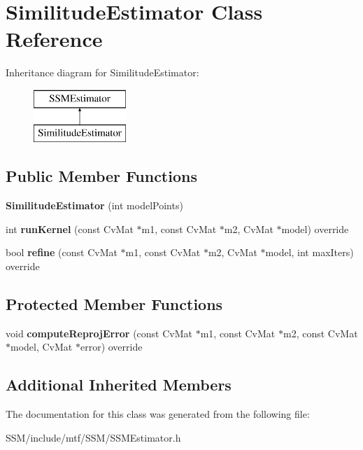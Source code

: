 \hypertarget{classSimilitudeEstimator}{\section{Similitude\-Estimator Class Reference}
\label{classSimilitudeEstimator}
}
Inheritance diagram for Similitude\-Estimator\-:\begin{figure}[H]
\begin{center}
\leavevmode
\includegraphics[height=2.000000cm]{classSimilitudeEstimator}
\end{center}
\end{figure}
\subsection*{Public Member Functions}
\begin{DoxyCompactItemize}
\item 
\hypertarget{classSimilitudeEstimator_a638df39ef9dfc2453d6715c574c1f8c5}{{\bfseries Similitude\-Estimator} (int model\-Points)}\label{classSimilitudeEstimator_a638df39ef9dfc2453d6715c574c1f8c5}

\item 
\hypertarget{classSimilitudeEstimator_aedc1a5cdb0d3fbb52e6b708d74481324}{int {\bfseries run\-Kernel} (const Cv\-Mat $\ast$m1, const Cv\-Mat $\ast$m2, Cv\-Mat $\ast$model) override}\label{classSimilitudeEstimator_aedc1a5cdb0d3fbb52e6b708d74481324}

\item 
\hypertarget{classSimilitudeEstimator_aa665066e891d37474f90d28b7053847d}{bool {\bfseries refine} (const Cv\-Mat $\ast$m1, const Cv\-Mat $\ast$m2, Cv\-Mat $\ast$model, int max\-Iters) override}\label{classSimilitudeEstimator_aa665066e891d37474f90d28b7053847d}

\end{DoxyCompactItemize}
\subsection*{Protected Member Functions}
\begin{DoxyCompactItemize}
\item 
\hypertarget{classSimilitudeEstimator_adf1900d0956e5a28aec5d9f39d617c04}{void {\bfseries compute\-Reproj\-Error} (const Cv\-Mat $\ast$m1, const Cv\-Mat $\ast$m2, const Cv\-Mat $\ast$model, Cv\-Mat $\ast$error) override}\label{classSimilitudeEstimator_adf1900d0956e5a28aec5d9f39d617c04}

\end{DoxyCompactItemize}
\subsection*{Additional Inherited Members}


The documentation for this class was generated from the following file\-:\begin{DoxyCompactItemize}
\item 
S\-S\-M/include/mtf/\-S\-S\-M/S\-S\-M\-Estimator.\-h\end{DoxyCompactItemize}
